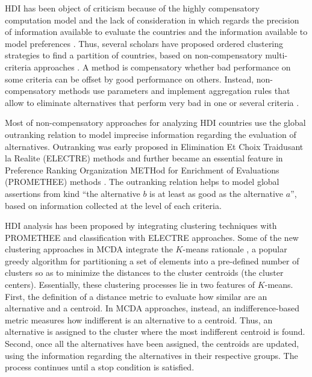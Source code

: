 \documentclass[]{elsarticle}
\theoremstyle{definition}
\begin{document}
HDI has been object of criticism because of the highly compensatory computation model and the lack of consideration in which regards the precision of information available to evaluate the countries and the information available to model preferences \citep{Noorbakhsh1998, Berenger2007, Klugman2011, Martinez2013}.  Thus, several scholars have proposed  ordered clustering strategies to find a partition of countries, based on non-compensatory multi-criteria approaches \citep{DeSmet2014,Boujelben2016}.  A method is compensatory whether bad performance on some criteria can be offset by good performance on others.  Instead, non-compensatory methods use parameters and implement aggregation rules that allow to eliminate alternatives that perform very bad in one or several criteria \citep{figueira2010}.  

Most of non-compensatory approaches for analyzing HDI countries use the global outranking relation to model imprecise information regarding the evaluation of alternatives. Outranking was early proposed in Elimination Et Choix Traidusant la Realite (ELECTRE) methods \citep{figueira2010} and further became an essential feature in  Preference Ranking Organization METHod for Enrichment of Evaluations (PROMETHEE) methods \cite{brans85}. The outranking relation helps to model global  assertions from kind ``the alternative $b$ is at least as good as the alternative $a$'', based on information collected at the level of each criteria. 

HDI analysis has been proposed by integrating clustering techniques with PROMETHEE \citep{Chen2018} and classification with ELECTRE \citep{doCarvalhalMonteiro2018} approaches. Some of the new clustering approaches in MCDA integrate the $K$-means rationale \citep{DeSmet2009,Lolli2014,Panapakidis2018}, a popular greedy algorithm for partitioning a set of elements into a pre-defined number of clusters so as to minimize the distances to the cluster centroids (the cluster centers). Essentially, these clustering processes lie in two features of $K$-means. First, the definition of a distance metric to evaluate how similar are an alternative and a centroid.  In MCDA approaches,  instead, an indifference-based metric measures how indifferent is an alternative to a centroid. Thus, an alternative is assigned to the cluster where the most indifferent centroid is found. Second, once all the alternatives have been assigned, the centroids are updated, using the information regarding the alternatives in their respective groups.  The process continues until a stop condition is satisfied. 
\end{document}
